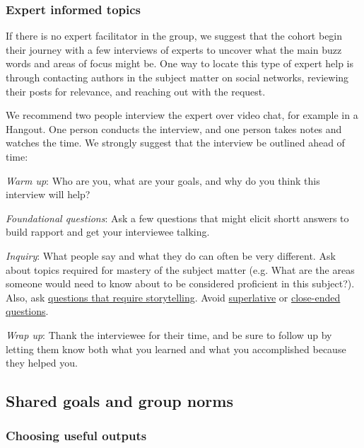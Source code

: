 \subsubsection{Expert informed topics}

If there is no expert facilitator in the group, we suggest that the
cohort begin their journey with a few interviews of experts to uncover
what the main buzz words and areas of focus might be. One way to locate
this type of expert help is through contacting authors in the subject
matter on social networks, reviewing their posts for relevance, and
reaching out with the request.

We recommend two people interview the expert over video chat, for
example in a Hangout. One person conducts the interview, and one person
takes notes and watches the time. We strongly suggest that the interview
be outlined ahead of time:

\emph{Warm up}: Who are you, what are your goals, and why do you think
this interview will help?

\emph{Foundational questions}: Ask a few questions that might elicit
shortt answers to build rapport and get your interviewee talking.

\emph{Inquiry}: What people say and what they do can often be very
different. Ask about topics required for mastery of the subject matter
(e.g. What are the areas someone would need to know about to be
considered proficient in this subject?). Also, ask
\href{http://en.wikipedia.org/wiki/Critical\_Incident\_Technique}{questions
that require storytelling}. Avoid
\href{http://en.wikipedia.org/wiki/Superlative}{superlative} or
\href{http://en.wikipedia.org/wiki/Closed-ended\_question}{close-ended
questions}.

\emph{Wrap up}: Thank the interviewee for their time, and be sure to
follow up by letting them know both what you learned and what you
accomplished because they helped you.

\subsection{Shared goals and group norms}

\subsubsection{Choosing useful outputs}

